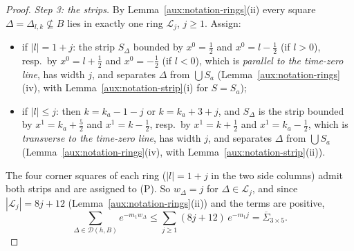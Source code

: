 \documentclass[11pt,a4paper]{article}
\theoremstyle{plain}
\theoremstyle{definition}
\theoremstyle{plain}
\theoremstyle{definition}
\begin{document}
\begin{proof}
\emph{Step 3: the strips.}  By Lemma~\ref{aux:notation-rings}(ii) every square
$\Delta=\Delta_{l,k}\not\subseteq B$ lies in exactly one ring $\mathcal L_j$, $j\ge1$.  Assign:
\begin{itemize}
\item[(P)] if $|l|=1+j$: the strip $S_\Delta$ bounded by $x^0=\frac12$ and $x^0=l-\frac12$ (if
$l>0$), resp.\ by $x^0=l+\frac12$ and $x^0=-\frac12$ (if $l<0$), which is \emph{parallel to the
time-zero line}, has width $j$, and separates $\Delta$ from $\bigcup S_a$
(Lemma~\ref{aux:notation-rings}(iv), with Lemma~\ref{aux:notation-strip}(i) for $S=S_a$);
\item[(T)] if $|l|\le j$: then $k=k_a-1-j$ or $k=k_a+3+j$, and $S_\Delta$ is the strip bounded by
$x^1=k_a+\frac52$ and $x^1=k-\frac12$, resp.\ by $x^1=k+\frac12$ and $x^1=k_a-\frac12$, which is
\emph{transverse to the time-zero line}, has width $j$, and separates $\Delta$ from $\bigcup S_a$
(Lemma~\ref{aux:notation-rings}(iv), with Lemma~\ref{aux:notation-strip}(ii)).
\end{itemize}
The four corner squares of each ring ($|l|=1+j$ in the two side columns) admit both strips and are
assigned to (P).  So $w_\Delta=j$ for $\Delta\in\mathcal L_j$, and since $|\mathcal L_j|=8j+12$
(Lemma~\ref{aux:notation-rings}(ii)) and the terms are positive,
\[
 \sum_{\Delta\in\mathcal D(h,B)}e^{-m_1w_\Delta}\le\sum_{j\ge1}(8j+12)\,e^{-m_1j}
 =\overline\Sigma_{3\times5} .
\]


\end{proof}
\end{document}
